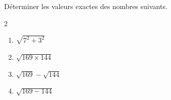 \begin{exo}{}
	Déterminer les valeurs exactes des nombres suivants.
	\vspace*{-2mm}\begin{multicols}{2}
	\begin{enumerate}[itemsep=2mm]
		\item $\sqrt{7^2 + 3^2}$
		\item $\sqrt{169 \times 144}$
		\item $\sqrt{169} - \sqrt{144}$
		\item $\sqrt{169 - 144}$
	\end{enumerate}
	\end{multicols}
\end{exo}
